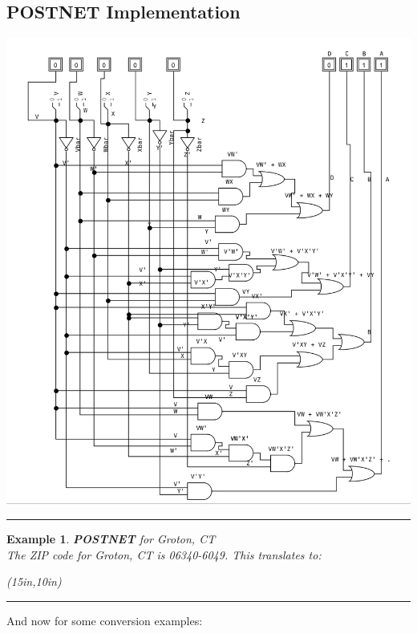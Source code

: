 \documentclass[12pt]{article}
\newtheorem{example}{Example}
\newenvironment{examp}
{\vspace{0.5cm}
\hrule
\begin{example}}
{\hrule
\vspace{0.5cm}
\end{example}}
\begin{document}
\subsection*{POSTNET Implementation}
\includegraphics[scale=.60]{postnetimp}
\begin{examp}
	\textbf{POSTNET} for Groton, CT\\
	\vspace{.5cm}
	The ZIP code for Groton, CT is 06340-6049. This translates to:
	\begin{center}
		\begin{pspicture}(15in,10in)
		\end{pspicture}
	\end{center}
\end{examp}
And now for some conversion examples:
\end{document}
